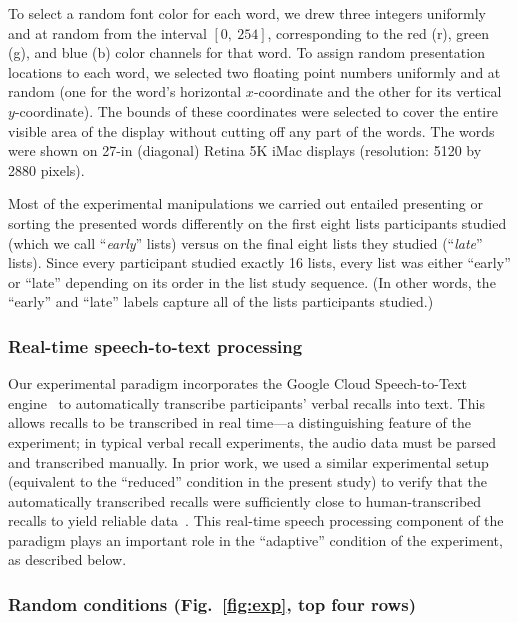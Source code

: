 \documentclass[11pt]{article}
\begin{document}
To select a random font color for each word, we drew three integers uniformly
and at random from the interval $\left[0,~254\right]$, corresponding to the red
(r), green (g), and blue (b) color channels for that word. To assign random
presentation locations to each word, we selected two floating point numbers
uniformly and at random (one for the word's horizontal $x$-coordinate and the
other for its vertical $y$-coordinate). The bounds of these coordinates were
selected to cover the entire visible area of the display without cutting off
any part of the words. The words were shown on 27-in (diagonal) Retina 5K iMac
displays (resolution: 5120 by 2880 pixels).

Most of the experimental manipulations we carried out entailed presenting or
sorting the presented words differently on the first eight lists participants
studied (which we call ``\textit{early}'' lists) versus on the final eight
lists they studied (``\textit{late}'' lists). Since every participant studied
exactly 16 lists, every list was either ``early'' or ``late'' depending on its
order in the list study sequence. (In other words, the ``early'' and ``late''
labels capture all of the lists participants studied.)


\subsubsection*{Real-time speech-to-text processing}

Our experimental paradigm incorporates the Google Cloud Speech-to-Text
engine~\citep{HalpEtal16} to automatically transcribe participants' verbal
recalls into text. This allows recalls to be transcribed in real time---a
distinguishing feature of the experiment; in typical verbal recall experiments,
the audio data must be parsed and transcribed manually. In prior work, we used
a similar experimental setup (equivalent to the ``reduced'' condition in the
present study) to verify that the automatically transcribed recalls were
sufficiently close to human-transcribed recalls to yield reliable
data~\citep{ZimaEtal18}. This real-time speech processing component of the
paradigm plays an important role in the ``adaptive'' condition of the
experiment, as described below.

\subsubsection*{Random conditions (Fig.~\ref{fig:exp}, top four rows)}
\end{document}
